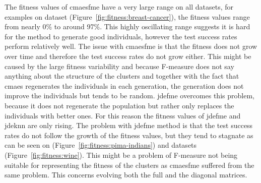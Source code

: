 The fitness values of \ac{cmaesfme} have a very large range on all datasets, for examples on  dataset (Figure~\ref{fig:fitness:breast-cancer}), the fitness values range from nearly 0\% to around 97\%. This highly oscillating range suggests it is hard for the method to generate good individuals, however the test success rates perform relatively well. The issue with \ac{cmaesfme} is that the fitness does not grow over time and therefore the test success rates do not grow either. This might be caused by the large fitness variability and because \mbox{F-measure} does not say anything about the structure of the clusters and together with the fact that \ac{cmaes} regenerates the individuals in each generation, the generation does not improve the individuals but tends to be random. \ac{jdefme} overcomes this problem, because it does not regenerate the population but rather only replaces the individuals with better ones. For this reason the fitness values of \ac{jdefme} and \ac{jdeknn} are only rising. The problem with \ac{jdefme} method is that the test success rates do not follow the growth of the fitness values, but they tend to stagnate as can be seen on  (Figure~\ref{fig:fitness:pima-indians}) and  datasets (Figure~\ref{fig:fitness:wine}). This might be a problem of \mbox{F-measure} not being suitable for representing the fitness of the clusters as \ac{cmaesfme} suffered from the same problem. This concerns evolving both the full and the diagonal matrices.


